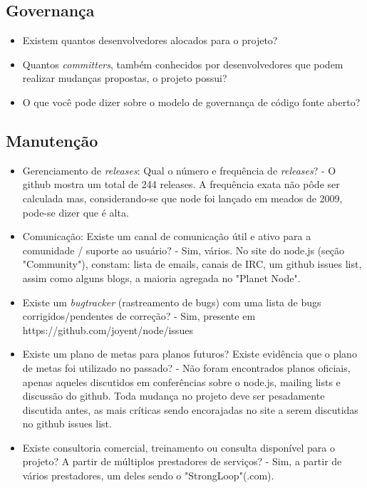 \documentclass[12pt,a4paper]{article} %
\begin{document}
\subsection{Governança}


\begin{itemize}
\item Existem quantos desenvolvedores alocados para o projeto?
\item Quantos \textit{committers}, também conhecidos por desenvolvedores que podem realizar mudanças propostas, o projeto possui?
\item O que você pode dizer sobre o modelo de governança de código fonte aberto?
\end{itemize}

\subsection{Manutenção}


\begin{itemize}
\item Gerenciamento de \textit{releases}: Qual o número e frequência de \textit{releases}? - O github mostra um total de 244 releases. A frequência exata não pôde ser calculada mas, considerando-se que node foi lançado em meados de 2009, pode-se dizer que é alta.
\item Comunicação: Existe um canal de comunicação útil e ativo para a comunidade / suporte ao usuário? - Sim, vários. No site do node.js (seção "Community"), constam: lista de emails, canais de IRC, um github issues list, assim como alguns blogs, a maioria agregada no "Planet Node".
\item Existe um \textit{bugtracker} (rastreamento de bugs) com uma lista de bugs corrigidos/pendentes de correção? - Sim, presente em https://github.com/joyent/node/issues
\item Existe um plano de metas para planos futuros? Existe evidência que o plano de metas foi utilizado no passado? - Não foram encontrados planos oficiais, apenas aqueles discutidos em conferências sobre o node.js, mailing lists e discussão do github. Toda mudança no projeto deve ser pesadamente discutida antes, as mais críticas sendo encorajadas no site a serem discutidas no github issues list.
\item Existe consultoria comercial, treinamento ou consulta disponível para o projeto? A partir de múltiplos prestadores de serviços?  - Sim, a partir de vários prestadores, um deles sendo o "StrongLoop"(.com).       
\end{itemize}
        

\par\vspace{\baselineskip}

\end{document}
